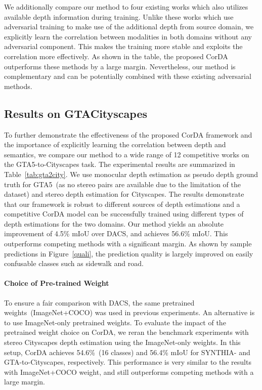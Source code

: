 \documentclass[10pt,twocolumn,letterpaper]{article}
\begin{document}
We additionally compare our method to four existing works which also utilizes available depth information during training. Unlike these works which use adversarial training to make use of the additional depth from source domain, we explicitly learn the correlation between modalities in both domains without any adversarial component. This makes the training more stable and exploits the correlation more effectively. As shown in the table, the proposed CorDA outperforms these methods by a large margin. Nevertheless, our method is complementary and can be potentially combined with these existing adversarial methods. 


\subsection{Results on GTACityscapes}
To further demonstrate the effectiveness of the proposed CorDA framework and the importance of explicitly learning the correlation between depth and semantics, we compare our method to a wide range of 12 competitive works on the GTA5-to-Cityscapes task. The experimental results are summarized in Table~\ref{tab:gta2city}. We use monocular depth estimation as pseudo depth ground truth for GTA5~(as no stereo pairs are available due to the limitation of the dataset) and stereo depth estimation for Cityscapes. The results demonstrate that our framework is robust to different sources of depth estimations and a competitive CorDA model can be successfully trained using different types of depth estimations for the two domains. Our method yields an absolute improvement of 4.5\% mIoU  over DACS, and achieves 56.6\% mIoU. This outperforms competing methods with a significant margin. As shown by sample predictions in Figure~\ref{quali}, the prediction quality is largely improved on easily confusable classes such as sidewalk and road.

\paragraph{Choice of Pre-trained Weight}
 To ensure a fair comparison with DACS, the same pretrained weights~(ImageNet+COCO) was used in previous experiments. An alternative is to use ImageNet-only pretrained weights. To evaluate the impact of the pretrained weight choice on CorDA, we reran the benchmark experiments with stereo Cityscapes depth estimation using the ImageNet-only weights. In this setup, CorDA achieves 54.6\%~(16 classes) and 56.4\% mIoU for SYNTHIA- and GTA-to-Cityscapes, respectively. This performance is very similar to the results with ImageNet+COCO  weight, and still outperforms competing methods with a large margin.
\end{document}
